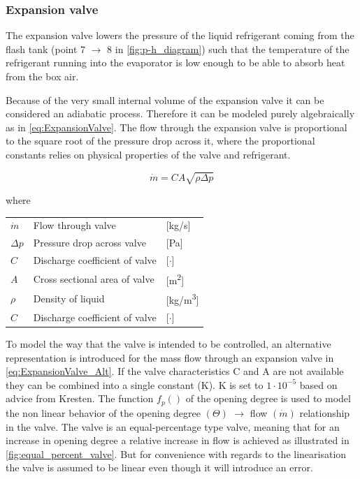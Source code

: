 \subsubsection{Expansion valve}
The expansion valve lowers the pressure of the liquid refrigerant coming from the flash tank (point 7 $\rightarrow$ 8 in \cref{fig:p-h_diagram}) such that the temperature of the refrigerant running into the evaporator is low enough to be able to absorb heat from the box air.

Because of the very small internal volume of the expansion valve it can be considered an adiabatic process. Therefore it can be modeled purely algebraically as in \cref{eq:ExpansionValve}. The flow through the expansion valve is proportional to the square root of the pressure drop across it, where the proportional constants relies on physical properties of the valve and refrigerant.

\begin{equation} \label{eq:ExpansionValve}
	\dot{m}= C A \sqrt{\rho\Delta p}
\end{equation}

where
\begin{center}
	\begin{tabular}{l p{8cm} l}
		$\dot{m}$ 	& Flow through valve & [\si{kg}/\si{s}]\\
		$\Delta p$ 	& Pressure drop across valve & [\si{Pa}]\\
		$C$ 		& Discharge coefficient of valve & [$\cdot$]\\
		$A$	 		& Cross sectional area of valve & [\si{m^2}]\\
		$\rho$ 		& Density of liquid & [\si{kg}/\si{m^3}]\\
			$C$ 	& Discharge coefficient of valve & [$\cdot$]\\
	\end{tabular}
\end{center}

To model the way that the valve is intended to be controlled, an alternative representation is introduced for the mass flow through an expansion valve in \cref{eq:ExpansionValve_Alt}. If the valve characteristics C and A are not available they can be combined into a single constant (K). K is set to $1 \cdot 10^{-5}$ based on advice from Kresten. The function $f_p()$ of the opening degree is used to model the non linear behavior of the opening degree $( \Theta )$ $\rightarrow$ flow $( \dot{m} )$ relationship in the valve. The valve is an equal-percentage type valve, meaning that for an increase in opening degree a relative increase in flow is achieved as illustrated in \cref{fig:equal_percent_valve}. But for convenience with regards to the linearisation the valve is assumed to be linear even though it will introduce an error.


